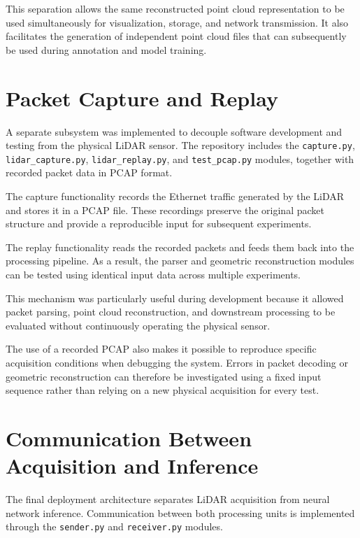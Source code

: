 This separation allows the same reconstructed point cloud representation to be used simultaneously for visualization, storage, and network transmission. It also facilitates the generation of independent point cloud files that can subsequently be used during annotation and model training.

\section{Packet Capture and Replay}
\label{sec:software_capture_replay}

A separate subsystem was implemented to decouple software development and testing from the physical LiDAR sensor. The repository includes the \texttt{capture.py}, \texttt{lidar\_capture.py}, \texttt{lidar\_replay.py}, and \texttt{test\_pcap.py} modules, together with recorded packet data in PCAP format.

The capture functionality records the Ethernet traffic generated by the LiDAR and stores it in a PCAP file. These recordings preserve the original packet structure and provide a reproducible input for subsequent experiments.

The replay functionality reads the recorded packets and feeds them back into the processing pipeline. As a result, the parser and geometric reconstruction modules can be tested using identical input data across multiple experiments.

This mechanism was particularly useful during development because it allowed packet parsing, point cloud reconstruction, and downstream processing to be evaluated without continuously operating the physical sensor.

The use of a recorded PCAP also makes it possible to reproduce specific acquisition conditions when debugging the system. Errors in packet decoding or geometric reconstruction can therefore be investigated using a fixed input sequence rather than relying on a new physical acquisition for every test.

\section{Communication Between Acquisition and Inference}
\label{sec:software_communication}

The final deployment architecture separates LiDAR acquisition from neural network inference. Communication between both processing units is implemented through the \texttt{sender.py} and \texttt{receiver.py} modules.

